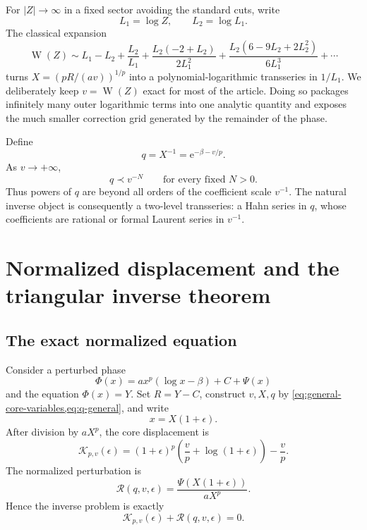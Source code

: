 \documentclass[11pt,oneside]{article}
\theoremstyle{plain}
\theoremstyle{definition}
\theoremstyle{remark}
\newcommand{\W}{\operatorname{W}}
\newcommand{\e}{\mathrm{e}}
\newcommand{\Rcal}{\mathcal{R}}
\newcommand{\Kcal}{\mathcal{K}}
\newcommand{\littleprec}{\prec}
\begin{document}
For \(|Z|\to\infty\) in a fixed sector avoiding the standard cuts, write
\[
 L_1=\log Z,
 \qquad L_2=\log L_1.
\]
The classical expansion
\begin{equation}
 \W(Z)\sim L_1-L_2+\frac{L_2}{L_1}
 +\frac{L_2(-2+L_2)}{2L_1^2}
 +\frac{L_2(6-9L_2+2L_2^2)}{6L_1^3}+\cdots
 \label{eq:W-outer}
\end{equation}
turns \(X=(pR/(av))^{1/p}\) into a polynomial-logarithmic transseries in
\(1/L_1\).  We deliberately keep \(v=\W(Z)\) exact for most of the article.
Doing so packages infinitely many outer logarithmic terms into one analytic
quantity and exposes the much smaller correction grid generated by the
remainder of the phase.

Define
\begin{equation}
 q=X^{-1}=\e^{-\beta-v/p}.
 \label{eq:q-general}
\end{equation}
As \(v\to+\infty\),
\begin{equation}
 q\littleprec v^{-N}\qquad\text{for every fixed }N>0.
 \label{eq:q-beyond-v}
\end{equation}
Thus powers of \(q\) are beyond all orders of the coefficient scale
\(v^{-1}\).  The natural inverse object is consequently a two-level
transseries: a Hahn series in \(q\), whose coefficients are rational or
formal Laurent series in \(v^{-1}\).

\section{Normalized displacement and the triangular inverse theorem}
\label{sec:triangular}

\subsection{The exact normalized equation}

Consider a perturbed phase
\begin{equation}
 \Phi(x)=a x^p(\log x-\beta)+C+\Psi(x)
 \label{eq:perturbed-phase}
\end{equation}
and the equation \(\Phi(x)=Y\).  Set \(R=Y-C\), construct \(v,X,q\) by
\cref{eq:general-core-variables,eq:q-general}, and write
\begin{equation}
 x=X(1+\epsilon).
 \label{eq:relative-displacement}
\end{equation}
After division by \(aX^p\), the core displacement is
\begin{equation}
 \Kcal_{p,v}(\epsilon)
 =(1+\epsilon)^p\left(\frac{v}{p}+\log(1+\epsilon)\right)-\frac{v}{p}.
 \label{eq:kernel-general}
\end{equation}
The normalized perturbation is
\begin{equation}
 \Rcal(q,v,\epsilon)
 =\frac{\Psi(X(1+\epsilon))}{aX^p}.
 \label{eq:normalized-remainder}
\end{equation}
Hence the inverse problem is exactly
\begin{equation}
 \Kcal_{p,v}(\epsilon)+\Rcal(q,v,\epsilon)=0.
 \label{eq:normalized-equation}
\end{equation}
\end{document}
